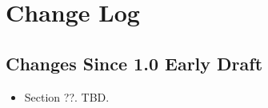 \chapter{Change Log}

\section{Changes Since 1.0 Early Draft}

\begin{itemize}
\item Section ??. TBD.
\end{itemize}
